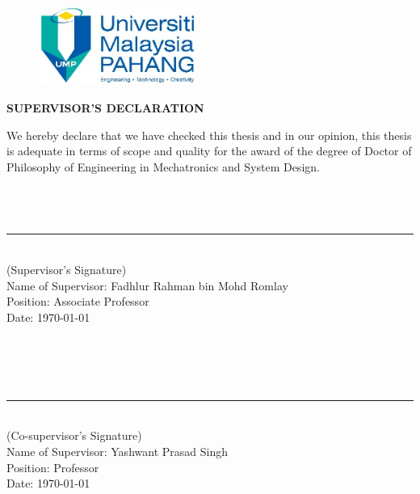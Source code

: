 \thispagestyle{empty}

\begin{figure}[h]
\begin{center}
	\includegraphics[width=12pc]{Image0/UMPLogo.jpg}
\end{center}
\end{figure}

\begin{center}
	\textbf{SUPERVISOR'S DECLARATION}\\
\end{center}

\begin{onehalfspacing}
\noindent
We hereby declare that we have checked this thesis and in our opinion, this thesis is adequate in terms of scope and quality for the award of the degree of Doctor of Philosophy of Engineering in Mechatronics and System Design.
\\
\\
\\
\\
\noindent\rule{5cm}{0.4pt}\\
(Supervisor's Signature)\\
Name of Supervisor: Fadhlur Rahman bin Mohd Romlay\\
Position: Associate Professor\\
Date: \today \\
\\
\\
\\
\\
\noindent\rule{5cm}{0.4pt}\\
(Co-supervisor's Signature)\\
Name of Supervisor: Yashwant Prasad Singh\\
Position: Professor\\
Date: \today \\
\end{onehalfspacing}